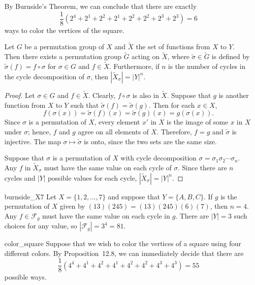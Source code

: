 By Burnside's Theorem, we can conclude that there are exactly
\[
\frac{1}{8} ( 2^4 + 2^1 + 2^2 + 2^1  + 2^2 + 2^2 +2^3 + 2^3)
= 6
\]
ways to color the vertices of the square.
 
 
\begin{proposition}
Let $G$ be a permutation group of $X$ and $\widetilde{X}$ the set of
functions from $X$ to $Y$. Then there exists a permutation group 
$\widetilde{G}$ acting on $\widetilde{X}$, where $\widetilde{\sigma} 
\in \widetilde{G}$ is defined by $\widetilde{\sigma}(f) = f \circ 
\sigma$ for $\sigma \in G$ and $f \in \widetilde{X}$. Furthermore, 
if $n$ is the number of cycles in the cycle decomposition 
of $\sigma$, then $|\widetilde{X}_{\sigma}| = |Y|^n$. 
\end{proposition}
 
 
\begin{proof}
Let $\sigma \in G$ and $f \in  \widetilde{X}$. Clearly, $f \circ
\sigma$ is also in $\widetilde{X}$. Suppose that $g$ is another
function from $X$ to $Y$ such that $\widetilde{\sigma}(f) =
\widetilde{\sigma}(g)$. Then for each $x \in X$,
\[
f( \sigma(x ))
= \widetilde{\sigma}(f)(x)
= \widetilde{\sigma}(g)(x)
= g( \sigma(x )).
\]
Since $\sigma$ is a permutation of $X$, every element $x'$ in $X$ is
the image of some $x$ in $X$ under $\sigma$; hence, $f$ and $g$ agree
on all elements of $X$. Therefore, $f=g$ and $\widetilde{\sigma}$ is
injective.  The map $\sigma \mapsto \widetilde{\sigma}$ is onto, since
the two sets are the same size.
 
 
Suppose that $\sigma$ is a permutation of $X$ with cycle decomposition
$\sigma = \sigma_1 \sigma_2 \cdots \sigma_n$. Any $f$ in
${\widetilde{X}}_{\sigma}$ must have the same value on each cycle of
$\sigma$. Since there are $n$ cycles and $|Y|$ possible values for
each cycle, $|{\widetilde{X}}_{\sigma}| = |Y|^n$.
\end{proof}
 
 
\begin{example}{burnside_X7}
Let $X = \{1, 2, \ldots, 7\}$ and suppose that $Y = \{ A, B, C \}$. If
$g$ is the permutation of $X$ given by $(1 3)(2 4 5) = (1 3)(2 4
5)(6)(7)$, then $n = 4$. Any $f \in {\mathcal F}_g$ must have the same
value on each cycle in $g$. There are $|Y|=3$ such choices for any
value, so $|{\mathcal F}_g|  = 3^4 = 81$.
\end{example}
 
 
\begin{example}{color_square}
Suppose that we wish to color the vertices of a square using four
different colors. By Proposition~12.8, we can immediately
decide that there are 
\[
\frac{1}{8} (4^4 + 4^1 + 4^2 + 4^1 + 4^2 + 4^ 2 + 4^3 + 4^3)
=55
\]
possible ways.
\end{example}
 

